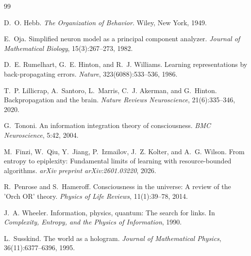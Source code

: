 \documentclass{article}
\begin{document}

\begin{thebibliography}{99}

D.~O. Hebb.
\newblock \emph{The Organization of Behavior}.
\newblock Wiley, New York, 1949.

E.~Oja.
\newblock Simplified neuron model as a principal component analyzer.
\newblock \emph{Journal of Mathematical Biology}, 15(3):267--273, 1982.

D.~E. Rumelhart, G.~E. Hinton, and R.~J. Williams.
\newblock Learning representations by back-propagating errors.
\newblock \emph{Nature}, 323(6088):533--536, 1986.

T.~P. Lillicrap, A.~Santoro, L.~Marris, C.~J. Akerman, and G.~Hinton.
\newblock Backpropagation and the brain.
\newblock \emph{Nature Reviews Neuroscience}, 21(6):335--346, 2020.

G.~Tononi.
\newblock An information integration theory of consciousness.
\newblock \emph{BMC Neuroscience}, 5:42, 2004.

M.~Finzi, W.~Qiu, Y.~Jiang, P.~Izmailov, J.~Z. Kolter, and A.~G. Wilson.
\newblock From entropy to epiplexity: Fundamental limits of learning with resource-bounded algorithms.
\newblock \emph{arXiv preprint arXiv:2601.03220}, 2026.

R.~Penrose and S.~Hameroff.
\newblock Consciousness in the universe: A review of the 'Orch OR' theory.
\newblock \emph{Physics of Life Reviews}, 11(1):39--78, 2014.

J.~A. Wheeler.
\newblock Information, physics, quantum: The search for links.
\newblock In \emph{Complexity, Entropy, and the Physics of Information}, 1990.

L.~Susskind.
\newblock The world as a hologram.
\newblock \emph{Journal of Mathematical Physics}, 36(11):6377--6396, 1995.

\end{thebibliography}
\end{document}

